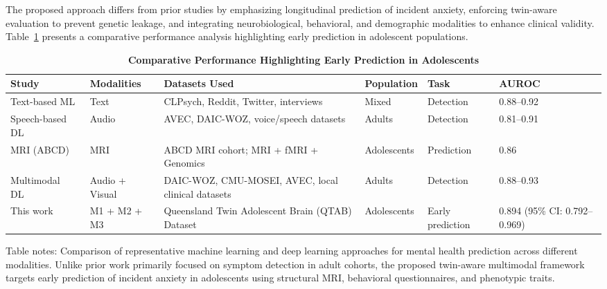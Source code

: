 \documentclass[10pt,letterpaper]{article}
\begin{document}
The proposed approach differs from prior studies by emphasizing longitudinal prediction of incident anxiety, enforcing twin-aware evaluation to prevent genetic leakage, and integrating neurobiological, behavioral, and demographic modalities to enhance clinical validity. Table~\ref{tab:performance_comparison} presents a comparative performance analysis highlighting early prediction in adolescent populations.

\begin{table}[!t]
\begin{adjustwidth}{-2.25in}{0in}
\centering
\caption{\textbf{Comparative Performance Highlighting Early Prediction in Adolescents}}
\label{tab:performance_comparison}
\footnotesize
\renewcommand{\arraystretch}{1.15}

\begin{tabular}{|p{3.0cm}|p{2.4cm}|p{3.6cm}|p{2.0cm}|p{2.0cm}|p{2.4cm}|}
\hline
\textbf{Study} & \textbf{Modalities} & \textbf{Datasets Used} & \textbf{Population} & \textbf{Task} & \textbf{AUROC} \\
\hline

Text-based ML~\cite{ref11,ref17}
& Text
& CLPsych, Reddit, Twitter, interviews
& Mixed
& Detection
& 0.88--0.92 \\
\hline

Speech-based DL~\cite{ref14,ref27}
& Audio
& AVEC, DAIC-WOZ, voice/speech datasets
& Adults
& Detection
& 0.81--0.91 \\
\hline

MRI (ABCD)~\cite{ref46}
& MRI
& ABCD MRI cohort; MRI + fMRI + Genomics
& Adolescents
& Prediction
& 0.86 \\
\hline

Multimodal DL~\cite{ref5,ref7,ref8,ref10}
& Audio + Visual
& DAIC-WOZ, CMU-MOSEI, AVEC, local clinical datasets
& Adults
& Detection
& 0.88--0.93 \\
\hline

This work
& M1 + M2 + M3
& Queensland Twin Adolescent Brain (QTAB) Dataset~\cite{ref31}
& Adolescents
& Early prediction
& 0.894 (95\% CI: 0.792--0.969) \\
\hline

\end{tabular}

\begin{flushleft}
Table notes: Comparison of representative machine learning and deep learning
approaches for mental health prediction across different modalities.
Unlike prior work primarily focused on symptom detection in adult cohorts,
the proposed twin-aware multimodal framework targets early prediction of
incident anxiety in adolescents using structural MRI, behavioral
questionnaires, and phenotypic traits.
\end{flushleft}

\end{adjustwidth}
\end{table}
\end{document}

